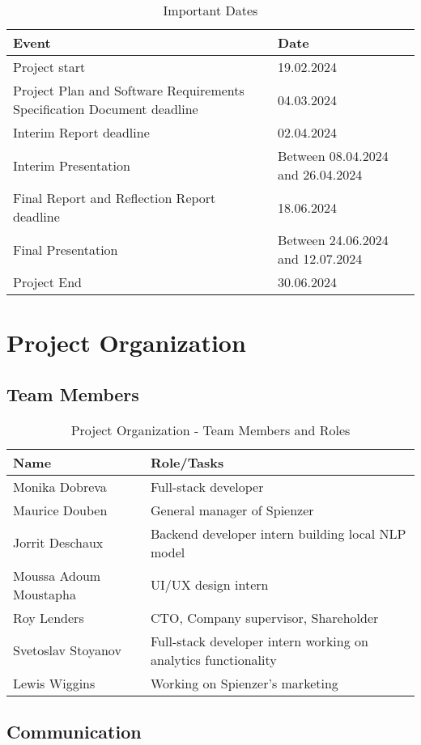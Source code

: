 \documentclass[12pt,a4paper]{article}
\begin{document}
\begin{table}[h!]
\centering
\begin{adjustbox}{scale=1,center}
\begin{tabular}{|l|l|}
\hline
\textbf{Event} & \textbf{Date} \\
\hline
Project start & 19.02.2024 \\ \hline
Project Plan and Software Requirements Specification Document deadline & 04.03.2024 \\ \hline
Interim Report deadline & 02.04.2024 \\ \hline
Interim Presentation & Between 08.04.2024 and 26.04.2024 \\ \hline
Final Report and Reflection Report deadline & 18.06.2024 \\ \hline
Final Presentation & Between 24.06.2024 and 12.07.2024 \\
Project End & 30.06.2024 \\
\hline
\end{tabular}
\end{adjustbox}
\caption{Important Dates}
\end{table}




\vspace{\baselineskip} %

\section{Project Organization}
\subsection{Team Members}


\begin{table}[h!]
\centering
\begin{tabular}{|l|l|}
\hline
\textbf{Name} & \textbf{Role/Tasks} \\
\hline
Monika Dobreva & Full-stack developer \\
\hline
Maurice Douben & General manager of Spienzer \\
\hline
Jorrit Deschaux & Backend developer intern building local NLP model \\
\hline
Moussa Adoum Moustapha & UI/UX design intern \\
\hline
Roy Lenders & CTO, Company supervisor, Shareholder \\
\hline
Svetoslav Stoyanov & Full-stack developer intern working on analytics functionality \\
\hline
Lewis Wiggins & Working on Spienzer’s marketing \\
\hline
\end{tabular}
\caption{Project Organization - Team Members and Roles}
\end{table}



\subsection{Communication}

\newpage
\end{document}
